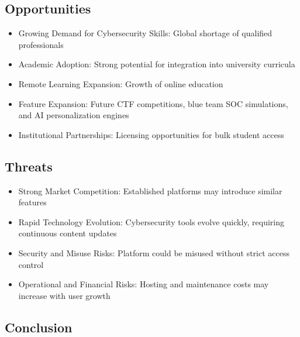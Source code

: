 \documentclass[12pt,a4paper]{report}
\begin{document}
\subsection{Opportunities}
\begin{itemize}
  \item Growing Demand for Cybersecurity Skills: Global shortage of qualified professionals
  \item Academic Adoption: Strong potential for integration into university curricula
  \item Remote Learning Expansion: Growth of online education
  \item Feature Expansion: Future CTF competitions, blue team SOC simulations, and AI personalization engines
  \item Institutional Partnerships: Licensing opportunities for bulk student access
\end{itemize}

\subsection{Threats}
\begin{itemize}
  \item Strong Market Competition: Established platforms may introduce similar features
  \item Rapid Technology Evolution: Cybersecurity tools evolve quickly, requiring continuous content updates
  \item Security and Misuse Risks: Platform could be misused without strict access control
  \item Operational and Financial Risks: Hosting and maintenance costs may increase with user growth
\end{itemize}

\subsection{Conclusion}
\end{document}
